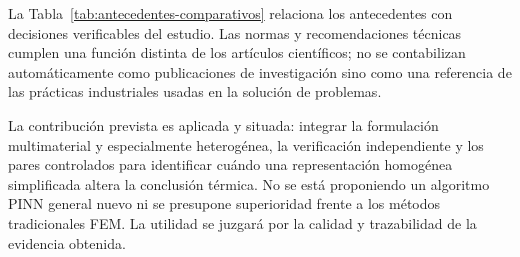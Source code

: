 La Tabla~\ref{tab:antecedentes-comparativos} relaciona los antecedentes con decisiones verificables del estudio. Las normas y recomendaciones técnicas cumplen una función distinta de los artículos científicos; no se contabilizan automáticamente como publicaciones de investigación sino como una referencia de las prácticas industriales usadas en la solución de problemas.

La contribución prevista es aplicada y situada: integrar la formulación multimaterial y especialmente heterogénea, la verificación independiente y los pares controlados para identificar cuándo una representación homogénea simplificada altera la conclusión térmica. No se está proponiendo un algoritmo PINN general nuevo ni se presupone superioridad frente a los métodos tradicionales FEM. La utilidad se juzgará por la calidad y trazabilidad de la evidencia obtenida.

